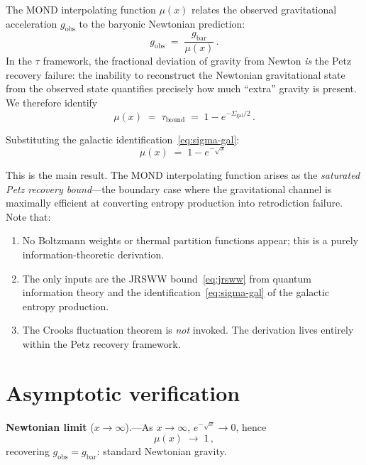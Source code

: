 \documentclass[prd,twocolumn,superscriptaddress,longbibliography,floatfix]{revtex4-2}
\newcommand{\tauasym}{\tau}
\begin{document}
The MOND interpolating function $\mu(x)$ relates the observed
gravitational acceleration $g_{\mathrm{obs}}$ to the baryonic
Newtonian prediction:
\begin{equation}
  g_{\mathrm{obs}} \;=\; \frac{g_{\mathrm{bar}}}{\mu(x)}\,.
  \label{eq:mond-def}
\end{equation}
In the $\tauasym$ framework, the fractional deviation of gravity
from Newton \emph{is} the Petz recovery failure: the inability to
reconstruct the Newtonian gravitational state from the observed
state quantifies precisely how much ``extra'' gravity is present.
We therefore identify
\begin{equation}
  \mu(x) \;=\; \tauasym_{\mathrm{bound}}
  \;=\; 1 - e^{-\Sigma_{\mathrm{gal}}/2}\,.
  \label{eq:mu-tau}
\end{equation}

Substituting the galactic identification~\eqref{eq:sigma-gal}:
\begin{equation}
  \boxed{\;\mu(x) \;=\; 1 - e^{-\sqrt{x}}\;\;}
  \label{eq:mu-petz}
\end{equation}

This is the main result. The MOND interpolating function arises as
the \emph{saturated Petz recovery bound}---the boundary case where
the gravitational channel is maximally efficient at converting
entropy production into retrodiction failure. Note that:
\begin{enumerate}
  \item No Boltzmann weights or thermal partition functions appear;
    this is a purely information-theoretic derivation.
  \item The only inputs are the JRSWW bound~\eqref{eq:jrsww} from
    quantum information theory and the
    identification~\eqref{eq:sigma-gal} of the galactic entropy
    production.
  \item The Crooks fluctuation theorem is \emph{not} invoked. The
    derivation lives entirely within the Petz recovery framework.
\end{enumerate}

\section{Asymptotic verification}
\label{sec:asymptotics}

\textbf{Newtonian limit} ($x \to \infty$).---As
$x \to \infty$, $e^{-\sqrt{x}} \to 0$, hence
\begin{equation}
  \mu(x) \;\to\; 1\,,
  \label{eq:newton-limit}
\end{equation}
recovering $g_{\mathrm{obs}} = g_{\mathrm{bar}}$: standard
Newtonian gravity. \checkmark
\end{document}
